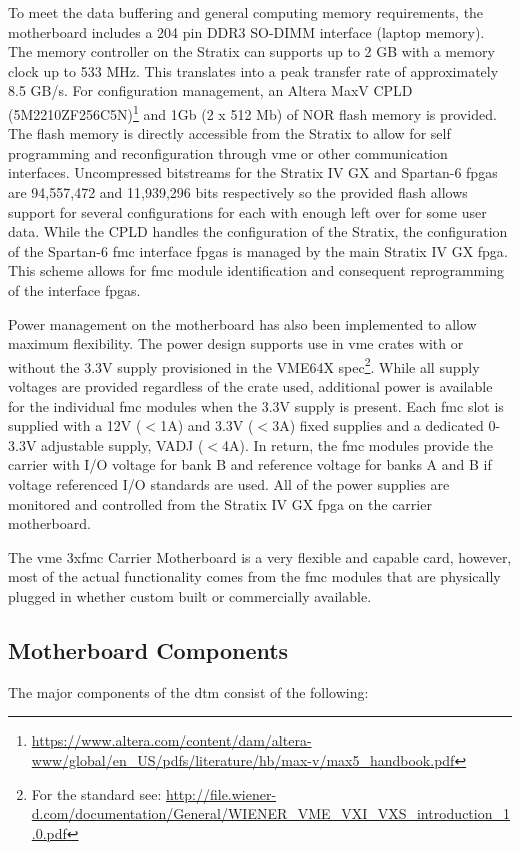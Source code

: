 To meet the data buffering and general computing memory requirements, the motherboard includes a 204 pin DDR3 SO-DIMM interface (laptop memory). 
The memory controller on the Stratix can supports up to 2 GB with a memory clock up to 533 MHz. 
This translates into a peak transfer rate of approximately 8.5 GB/s. For configuration management, an Altera MaxV CPLD (5M2210ZF256C5N)\footnote{\url{https://www.altera.com/content/dam/altera-www/global/en_US/pdfs/literature/hb/max-v/max5_handbook.pdf}} and 1Gb (2 x 512 Mb) of NOR flash memory is provided. The flash memory is directly accessible from the Stratix to allow for self programming and reconfiguration through \gls{vme} or other communication interfaces.
Uncompressed bitstreams for the Stratix IV GX and Spartan-6 \gls{fpga}s are 94,557,472 and 11,939,296 bits respectively so the provided flash allows support for several configurations for each with enough left over for some user data. 
While the CPLD handles the configuration of the Stratix, the configuration of the Spartan-6 \gls{fmc} interface \gls{fpga}s is managed by the main Stratix IV GX \gls{fpga}. This scheme allows for \gls{fmc} module identification and consequent reprogramming of the interface \gls{fpga}s.


Power management on the motherboard has also been implemented to allow maximum flexibility. The power design supports use in \gls{vme} crates with or without the 3.3V supply provisioned in the VME64X spec\footnote{For the standard see: \url{http://file.wiener-d.com/documentation/General/WIENER_VME_VXI_VXS_introduction_1.0.pdf}}. 
While all supply voltages are provided regardless of the crate used, additional power is available for the individual \gls{fmc} modules when the 3.3V supply is present. 
Each \gls{fmc} slot is supplied with a 12V ($<$1A) and 3.3V ($<$3A) fixed supplies and a dedicated 0-3.3V adjustable supply, VADJ ($<$4A). 
In return, the \gls{fmc} modules provide the carrier with I/O voltage for bank B and reference voltage for banks A and B if voltage referenced I/O standards are used.
All of the power supplies are monitored and controlled from the Stratix IV GX \gls{fpga} on the carrier motherboard.


The \gls{vme} 3x\gls{fmc} Carrier Motherboard is a very flexible and capable card, however, most of the actual functionality comes from the \gls{fmc} modules that are physically plugged in whether custom built or commercially available.



\subsection{Motherboard Components}
The major components of the \gls{dtm} consist of the following:

